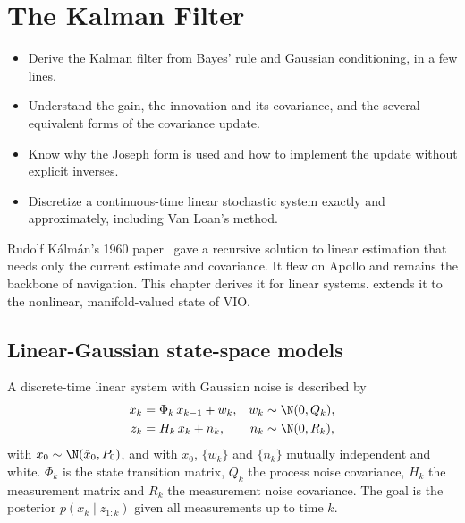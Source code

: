 \chapter{The Kalman Filter}
\label{ch:kf}

\begin{objectives}
\begin{itemize}
  \item Derive the Kalman filter from Bayes' rule and Gaussian conditioning, in a few lines.
  \item Understand the gain, the innovation and its covariance, and the several equivalent forms of
        the covariance update.
  \item Know why the Joseph form is used and how to implement the update without explicit inverses.
  \item Discretize a continuous-time linear stochastic system exactly and approximately, including Van
        Loan's method.
\end{itemize}
\end{objectives}

Rudolf Kálmán's 1960 paper~\cite{kalman1960} gave a recursive solution to linear estimation that
needs only the current estimate and covariance. It flew on Apollo and remains the backbone of
navigation. This chapter derives it for linear systems.  extends it to the nonlinear,
manifold-valued state of VIO.

\section{Linear-Gaussian state-space models}

A discrete-time linear system with Gaussian noise is described by
\begin{align}
  x_k &= \Phi_{k}\, x_{k-1} + w_k, & w_k &\sim \N(0, Q_k), \label{eq:lin-process}\\
  z_k &= H_k\, x_k + n_k, & n_k &\sim \N(0, R_k), \label{eq:lin-meas}
\end{align}
with $x_0 \sim \N(\hat x_0, P_0)$, and with $x_0$, $\{w_k\}$ and $\{n_k\}$ mutually independent and white.
$\Phi_k$ is the state transition matrix, $Q_k$ the process noise covariance, $H_k$ the measurement
matrix and $R_k$ the measurement noise covariance. The goal is the posterior $p(x_k \mid z_{1:k})$
given all measurements up to time $k$.

